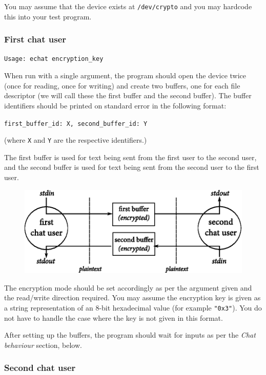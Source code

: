 \documentclass[12pt,a4paper]{article}
\begin{document}
You may assume that the device exists at \texttt{/dev/crypto} and you may hardcode
this into your test program.

\subsubsection*{First chat user}

\texttt{Usage: echat encryption\_key}

When run with a single argument, the program should open the device twice (once
for reading, once for writing) and create two buffers, one for each file
descriptor (we will call these the first buffer and the second buffer). The buffer
identifiers should be printed on standard error in the following format:

\texttt{first\_buffer\_id: X, second\_buffer\_id: Y}

(where \texttt{X} and \texttt{Y} are the respective identifiers.)

The first buffer is used for text being sent from the first user to the second
user, and the second buffer is used for text being sent from the second user to
the first user.

\begin{figure}[h]
    \centering
    \includegraphics{echat.eps}
    \label{fig:echat}
\end{figure}

The encryption mode should be set accordingly as per the argument given and the
read\slash write direction required. You may assume the encryption key is given
as a string representation of an 8-bit hexadecimal value (for example
\texttt{"0x3"}). You do not have to handle the case where the key is not given
in this format.

After setting up the buffers, the program should wait for inputs as per the
\textit{Chat behaviour} section, below.

\subsubsection*{Second chat user}
\end{document}
